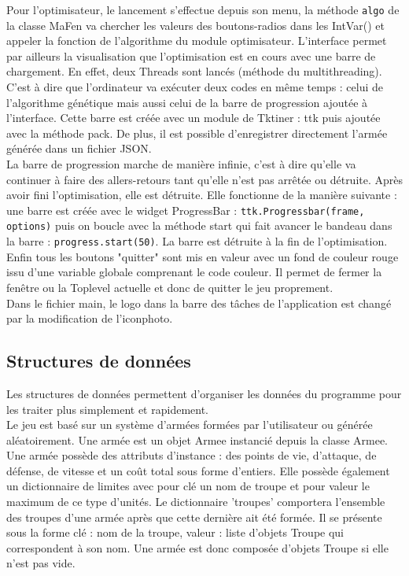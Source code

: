 \documentclass[a4paper]{article} %
\begin{document}
Pour l'optimisateur, le lancement s'effectue depuis son menu, la méthode \texttt{algo} de la classe MaFen va chercher les valeurs des boutons-radios dans les IntVar() et appeler la fonction de l'algorithme du module optimisateur. \label{InterfaceOptimisateur}
L'interface permet par ailleurs la visualisation que l'optimisation est en cours avec une barre de chargement. En effet, deux Threads sont lancés (méthode du multithreading). C'est à dire que l'ordinateur va exécuter deux codes en même temps : celui de l'algorithme génétique mais aussi celui de la barre de progression ajoutée à l'interface. Cette barre est créée avec un module de Tktiner : ttk puis ajoutée avec la méthode pack.
De plus, il est possible d'enregistrer directement l'armée générée dans un fichier JSON.
\\
La barre de progression marche de manière infinie, c'est à dire qu'elle va continuer à faire des allers-retours tant qu'elle n'est pas arrêtée ou détruite. Après avoir fini l'optimisation, elle est détruite. Elle fonctionne de la manière suivante : une barre est créée avec le widget ProgressBar : \texttt{ttk.Progressbar(frame, options)} puis on boucle avec la méthode start qui fait avancer le bandeau dans la barre : \texttt{progress.start(50)}. La barre est détruite à la fin de l'optimisation.\\

Enfin tous les boutons "quitter" sont mis en valeur avec un fond de couleur rouge issu d'une variable globale comprenant le code couleur. Il permet de fermer la fenêtre ou la Toplevel actuelle et donc de quitter le jeu proprement.\\

Dans le fichier main, le logo dans la barre des tâches de l'application est changé par la modification de l'iconphoto.

	\subsection{Structures de données}\label{structureDonnees}
Les structures de données permettent d'organiser les données du programme pour les traiter plus simplement et rapidement.\\

Le jeu est basé sur un système d'armées formées par l'utilisateur ou générée aléatoirement. Une armée est un objet Armee instancié depuis la classe Armee.
Une armée possède des attributs d'instance : des points de vie, d'attaque, de défense, de vitesse et un coût total sous forme d'entiers.
Elle possède également un dictionnaire de limites avec pour clé un nom de troupe et pour valeur le maximum de ce type d'unités.
Le dictionnaire 'troupes' comportera l'ensemble des troupes d'une armée après que cette dernière ait été formée. Il se présente sous la forme clé : nom de la troupe, valeur : liste d'objets Troupe qui correspondent à son nom.
Une armée est donc composée d'objets Troupe si elle n'est pas vide.\\
\end{document}

